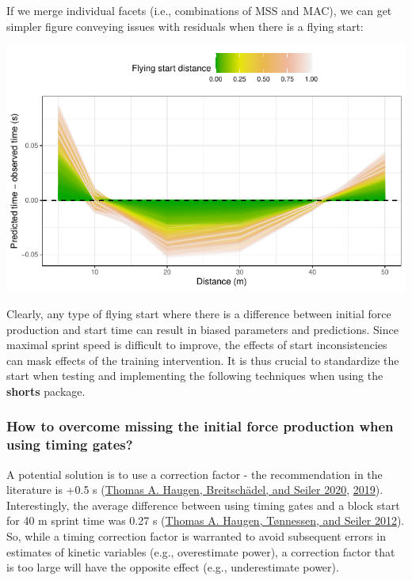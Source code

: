 \documentclass[fleqn,10pt,lineno]{wlpeerj} %
\begin{document}
If we merge individual facets (i.e., combinations of MSS and MAC), we can get simpler figure conveying issues with residuals when there is a flying start:

\begin{center}\includegraphics[width=0.9\linewidth]{paper_files/figure-latex/unnamed-chunk-33-1} \end{center}

Clearly, any type of flying start where there is a difference between initial force production and start time can result in biased parameters and predictions. Since maximal sprint speed is difficult to improve, the effects of start inconsistencies can mask effects of the training intervention. It is thus crucial to standardize the start when testing and implementing the following techniques when using the \textbf{shorts} package.

\hypertarget{how-to-overcome-missing-the-initial-force-production-when-using-timing-gates}{%
\subsubsection{How to overcome missing the initial force production when using timing gates?}\label{how-to-overcome-missing-the-initial-force-production-when-using-timing-gates}}

A potential solution is to use a correction factor - the recommendation in the literature is +0.5 s (\protect\hyperlink{ref-haugenSprintMechanicalProperties2020}{Thomas A. Haugen, Breitschädel, and Seiler 2020}, \protect\hyperlink{ref-haugenSprintMechanicalVariables2019}{2019}). Interestingly, the average difference between using timing gates and a block start for 40 m sprint time was 0.27 s (\protect\hyperlink{ref-haugenDifferenceStartImpact2012}{Thomas A. Haugen, Tønnessen, and Seiler 2012}). So, while a timing correction factor is warranted to avoid subsequent errors in estimates of kinetic variables (e.g., overestimate power), a correction factor that is too large will have the opposite effect (e.g., underestimate power).
\end{document}
